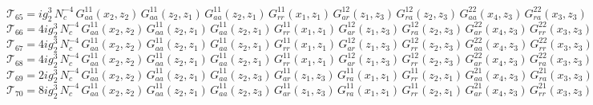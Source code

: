 \documentclass{article}
\begin{document}
\begin{equation*}
\mathcal{T}_{65} = i g_{2}^{3}\,N_c^{-4}\,G^{11}_{aa}\left(x_2,z_{2}\right) \, G^{11}_{aa}\left(z_{2},z_{1}\right) \, G^{11}_{aa}\left(z_{2},z_{1}\right) \, G^{11}_{rr}\left(x_1,z_{1}\right) \, G^{12}_{ar}\left(z_{1},z_{3}\right) \, G^{12}_{ra}\left(z_{2},z_{3}\right) \, G^{22}_{aa}\left(x_4,z_{3}\right) \, G^{22}_{ra}\left(x_3,z_{3}\right)
\end{equation*}
\begin{equation*}
\mathcal{T}_{66} = 4 i g_{2}^{3}\,N_c^{-4}\,G^{11}_{aa}\left(x_2,z_{2}\right) \, G^{11}_{aa}\left(z_{2},z_{1}\right) \, G^{11}_{aa}\left(z_{2},z_{1}\right) \, G^{11}_{rr}\left(x_1,z_{1}\right) \, G^{12}_{ar}\left(z_{1},z_{3}\right) \, G^{12}_{ra}\left(z_{2},z_{3}\right) \, G^{22}_{ar}\left(x_4,z_{3}\right) \, G^{22}_{rr}\left(x_3,z_{3}\right)
\end{equation*}
\begin{equation*}
\mathcal{T}_{67} = 4 i g_{2}^{3}\,N_c^{-4}\,G^{11}_{aa}\left(x_2,z_{2}\right) \, G^{11}_{aa}\left(z_{2},z_{1}\right) \, G^{11}_{aa}\left(z_{2},z_{1}\right) \, G^{11}_{rr}\left(x_1,z_{1}\right) \, G^{12}_{ar}\left(z_{1},z_{3}\right) \, G^{12}_{rr}\left(z_{2},z_{3}\right) \, G^{22}_{aa}\left(x_4,z_{3}\right) \, G^{22}_{rr}\left(x_3,z_{3}\right)
\end{equation*}
\begin{equation*}
\mathcal{T}_{68} = 4 i g_{2}^{3}\,N_c^{-4}\,G^{11}_{aa}\left(x_2,z_{2}\right) \, G^{11}_{aa}\left(z_{2},z_{1}\right) \, G^{11}_{aa}\left(z_{2},z_{1}\right) \, G^{11}_{rr}\left(x_1,z_{1}\right) \, G^{12}_{ar}\left(z_{1},z_{3}\right) \, G^{12}_{rr}\left(z_{2},z_{3}\right) \, G^{22}_{ar}\left(x_4,z_{3}\right) \, G^{22}_{ra}\left(x_3,z_{3}\right)
\end{equation*}
\begin{equation*}
\mathcal{T}_{69} = 2 i g_{2}^{3}\,N_c^{-4}\,G^{11}_{aa}\left(x_2,z_{2}\right) \, G^{11}_{aa}\left(z_{2},z_{1}\right) \, G^{11}_{aa}\left(z_{2},z_{3}\right) \, G^{11}_{ar}\left(z_{1},z_{3}\right) \, G^{11}_{ra}\left(x_1,z_{1}\right) \, G^{11}_{rr}\left(z_{2},z_{1}\right) \, G^{21}_{aa}\left(x_4,z_{3}\right) \, G^{21}_{ra}\left(x_3,z_{3}\right)
\end{equation*}
\begin{equation*}
\mathcal{T}_{70} = 8 i g_{2}^{3}\,N_c^{-4}\,G^{11}_{aa}\left(x_2,z_{2}\right) \, G^{11}_{aa}\left(z_{2},z_{1}\right) \, G^{11}_{aa}\left(z_{2},z_{3}\right) \, G^{11}_{ar}\left(z_{1},z_{3}\right) \, G^{11}_{ra}\left(x_1,z_{1}\right) \, G^{11}_{rr}\left(z_{2},z_{1}\right) \, G^{21}_{ar}\left(x_4,z_{3}\right) \, G^{21}_{rr}\left(x_3,z_{3}\right)
\end{equation*}
\end{document}
